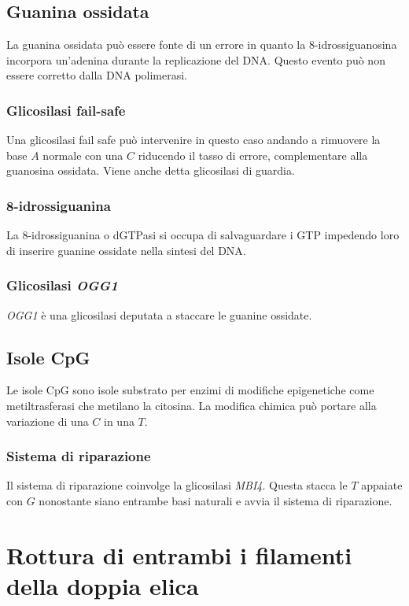 	\subsection{Guanina ossidata}
	La guanina ossidata pu\`o essere fonte di un errore in quanto la $8$-idrossiguanosina incorpora un'adenina durante la replicazione del DNA.
	Questo evento pu\`o non essere corretto dalla DNA polimerasi.

		\subsubsection{Glicosilasi fail-safe}
		Una glicosilasi fail safe pu\`o intervenire in questo caso andando a rimuovere la base $A$ normale con una $C$ riducendo il tasso di errore, complementare alla guanosina ossidata.
		Viene anche detta glicosilasi di guardia.

		\subsubsection{$\mathbf{8}$-idrossiguanina}
		La $8$-idrossiguanina o dGTPasi si occupa di salvaguardare i GTP impedendo loro di inserire guanine ossidate nella sintesi del DNA.

		\subsubsection{Glicosilasi \emph{OGG1}}
		\emph{OGG1} \`e una glicosilasi deputata a staccare le guanine ossidate.

	\subsection{Isole CpG}
	Le isole CpG sono isole substrato per enzimi di modifiche epigenetiche come metiltrasferasi che metilano la citosina.
	La modifica chimica pu\`o portare alla variazione di una $C$ in una $T$.

		\subsubsection{Sistema di riparazione}
		Il sistema di riparazione coinvolge la glicosilasi \emph{MBI4}.
		Questa stacca le $T$ appaiate con $G$ nonostante siano entrambe basi naturali e avvia il sistema di riparazione.

\section{Rottura di entrambi i filamenti della doppia elica}

